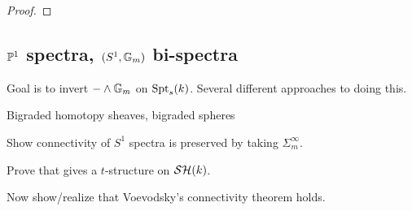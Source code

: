 \documentclass{amsart}%
\begin{document}
\begin{proof}

\end{proof}

\subsection{$\mathbb{P}^1$ spectra, $(S^1, \mathbb{G}_m)$ bi-spectra}

Goal is to invert $-\wedge \mathbb{G}_m$ on $\mathrm{Spt}_s(k)$. Several different
approaches to doing this. 

Bigraded homotopy sheaves, bigraded spheres

Show connectivity of $S^1$ spectra is preserved by taking
$\Sigma^{\infty}_m$.

Prove that \cite[Definition 5.2.1]{Mor03} gives a $t$-structure on
$\mathcal{SH}(k)$.

Now show/realize that Voevodsky's connectivity theorem holds. 
\end{document}
